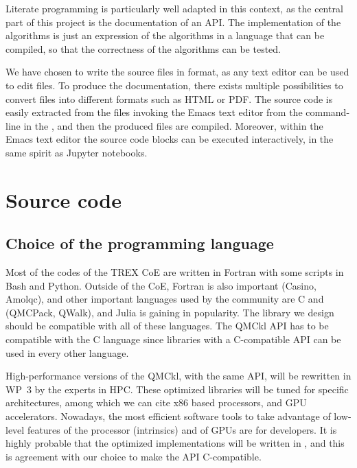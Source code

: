 Literate programming is particularly well adapted in this context, as
the central part of this project is the documentation of an
\ac{API}. The implementation of the algorithms is just an expression
of the algorithms in a language that can be compiled, so that the
correctness of the algorithms can be tested.

We have chosen to write the source files in {\orgmode}
format,\cite{schulte_2012} as any text editor can be used to edit
{\orgmode} files. To produce the documentation, there exists multiple
possibilities to convert {\orgmode} files into different formats such
as \ac{HTML} or \ac{PDF}. The source code is easily extracted from the
{\orgmode} files invoking the Emacs text editor from the command-line in the
{\Makefile}, and then the produced files are compiled.
Moreover, within the Emacs text editor the source code blocks can be
executed interactively, in the same spirit as Jupyter notebooks.\cite{Kluyver_2016}

\section{Source code}

\subsection{Choice of the programming language}

Most of the codes of the \ac{TREX} \ac{CoE} are written in Fortran
with some scripts in Bash and Python. Outside of the
\ac{CoE}, Fortran is also important (Casino, Amolqc), and other
important languages used by the community are C and {\CC} (QMCPack,
QWalk), and Julia is gaining in popularity.\cite{poole_2020} The
library we design should be compatible with all of these languages.
The \ac{QMCkl} \ac{API} has to be compatible with the C language
since libraries with a C-compatible \ac{API} can be used in every
other language.

High-performance versions of the \ac{QMCkl}, with the same \ac{API},
will be rewritten in \ac{WP}~3 by the experts in \ac{HPC}. These
optimized libraries will be tuned for specific architectures, among
which we can cite x86 based processors, and \ac{GPU} accelerators.
Nowadays, the most efficient software tools to take advantage of
low-level features of the processor (intrinsics) and of \acp{GPU} are
for {\CC} developers. It is highly probable that the optimized
implementations will be written in {\CC}, and this is agreement with our
choice to make the \ac{API} C-compatible.

